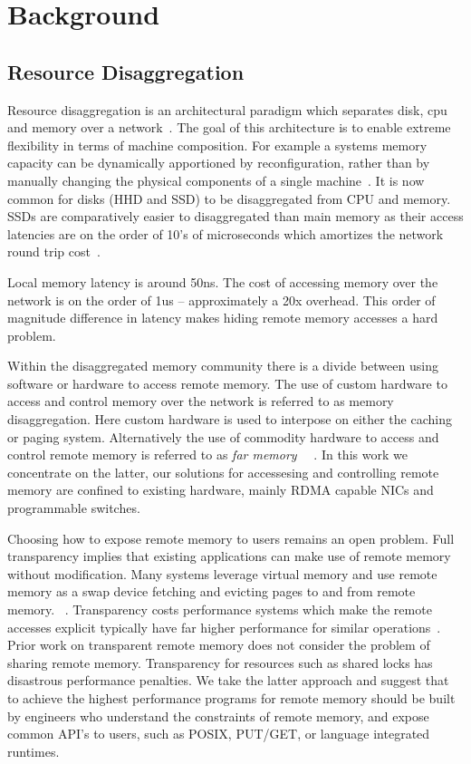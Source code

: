 \section{Background}


\subsection{Resource Disaggregation}

Resource disaggregation is an architectural paradigm which separates disk, cpu
and memory over a network~\cite{requirements,legoos}. The goal of this
architecture is to enable extreme flexibility in terms of machine composition.
For example a systems memory capacity can be dynamically apportioned by
reconfiguration, rather than by manually changing the physical components of a
single machine~\cite{fastswap}. It is now common for disks (HHD and SSD) to be
disaggregated from CPU and memory. SSDs are comparatively easier to
disaggregated than main memory as their access latencies are on the order of
10's of microseconds which amortizes the network round trip cost~\cite{decible}.

Local memory latency is around 50ns. The cost of accessing memory over the
network is on the order of 1us -- approximately a 20x overhead. This order of
magnitude difference in latency makes hiding remote memory accesses a hard
problem.  

Within the disaggregated memory community there is a divide between using
software or hardware to access remote memory.  The use of custom hardware to
access and control memory over the network is referred to as memory
disaggregation. Here custom hardware is used to interpose on either the caching
or paging system. Alternatively the use of commodity hardware to access and
control remote memory is referred to as \textit{far memory} ~\cite{reigons,
legoos, clover}~. In this work we concentrate on the latter, our
solutions for accessesing and controlling remote memory are confined to existing
hardware, mainly RDMA capable NICs and programmable switches.

Choosing how to expose remote memory to users remains an open problem. Full
transparency implies that existing applications can make use of remote memory
without modification. Many systems leverage virtual memory and use remote memory
as a swap device fetching and evicting pages to and from remote memory.
~\cite{fastswap,GMS,infiniswap,leap}. Transparency costs performance systems
which make the remote accesses explicit typically have far higher performance
for similar operations~\cite{aifm}.
Prior work on transparent remote memory does not consider the problem of sharing
remote memory. Transparency for resources such as shared locks has disastrous
performance penalties.  We take the latter approach and suggest that to achieve
the highest performance programs for remote memory should be built by engineers
who understand the constraints of remote memory, and expose common API's to
users, such as POSIX, PUT/GET, or language integrated runtimes.

